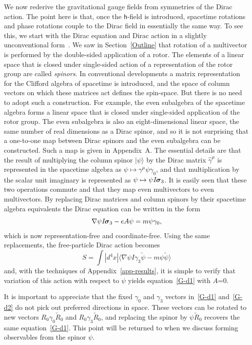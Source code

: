 \documentclass[a4paper]{article}
\numberwithin{equation}{section}
\newcommand{\la}{\langle}
\newcommand{\ra}{\rangle}
\newcommand{\sig}{\mbox{\boldmath $\sigma$}}
\newcommand{\bsig}{\mbox{\boldmath $\sig$}}
\newcommand{\isk}{I \hspace{-1pt} \bsig_3}
\newcommand{\gk}{\gamma_{3}}
\newcommand{\go}{\gamma_{0}}
\newcommand{\gamum}{\gamma^\mu}
\newcommand{\hgamum}{\hat{\gamma}^\mu}
\newcommand{\Rrev}{\tilde{R}}
\newcommand{\psirev}{\tilde{\psi}}
\newcommand{\lih}{\mathsf{h}}
\newcommand{\grad}{\nabla}
\begin{document}
We now rederive the gravitational gauge fields from symmetries of the
Dirac action.  The point here is that, once the $\lih$-field is
introduced, spacetime rotations and phase rotations couple to the
Dirac field in essentially the same way.  To see this, we start with
the Dirac equation and Dirac action in a slightly unconventional
form~\cite{hes75,DGL93-states,DGL93-lft}.  We saw in
Section~\ref{Outline} that rotation of a multivector is performed by
the double-sided application of a rotor.  The elements of a linear
space that is closed under single-sided action of a representation of
the rotor group are called \textit{spinors}.  In conventional
developments a matrix representation for the Clifford algebra of
spacetime is introduced, and the space of column vectors on which
these matrices act defines the spin-space.  But there is no need to
adopt such a construction.  For example, the even subalgebra of the
spacetime algebra forms a linear space that is closed under
single-sided application of the rotor group.  The even subalgebra is
also an eight-dimensional linear space, the same number of real
dimensions as a Dirac spinor, and so it is not surprising that a
one-to-one map between Dirac spinors and the even subalgebra can be
constructed.  Such a map is given in Appendix~A.  The essential
details are that the result of multiplying the column spinor
$|\psi\ra$ by the Dirac matrix $\hgamum$ is represented in the
spacetime algebra as $\psi\mapsto\gamum\psi\go$, and that
multiplication by the scalar unit imaginary is represented as
$\psi\mapsto\psi\isk$.  It is easily seen that these two operations
commute and that they map even multivectors to even multivectors.  By
replacing Dirac matrices and column spinors by their spacetime algebra
equivalents the Dirac equation can be written in the form
%
\begin{equation}
\grad \psi \isk -eA\psi = m \psi \go,
\label{G-d1}
\end{equation}
%
which is now representation-free and coordinate-free.  Using the same
replacements, the free-particle Dirac action becomes
%
\begin{equation}
S= \int |d^4 x| \la \grad \psi I\gk \psirev - m \psi \psirev \ra
\label{G-d2} 
\end{equation}
%
and, with the techniques of Appendix~\ref{app-results}, it is simple
to verify that variation of this action with respect to $\psi$ yields
equation~\eqref{G-d1} with $A$=0.  

It is important to appreciate that the fixed $\go$ and $\gk$ vectors
in~\eqref{G-d1} and~\eqref{G-d2} do not pick out preferred directions in
space.  These vectors can be rotated to new vectors $R_0\go\Rrev_0$
and $R_0\gk\Rrev_0$, and replacing the spinor by $\psi\Rrev_0$ recovers
the same equation~\eqref{G-d1}.  This point will be returned to when we
discuss forming observables from the spinor $\psi$.
\end{document}
